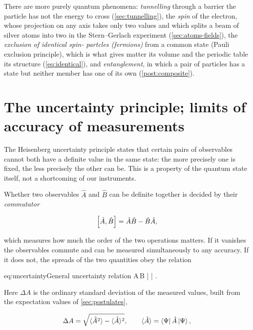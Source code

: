     There are more purely quantum phenomena: \emph{tunnelling} through a barrier the particle has not the energy to cross (\cref{sec:tunnelling}), the \emph{spin} of the electron, whose projection on any axis takes only two values and which splits a beam of silver atoms into two in the Stern--Gerlach experiment (\cref{sec:atoms-fields}), the \emph{exclusion of identical spin- partcles (fermions)} from a common state (Pauli exclusion principle), which is what gives matter its volume and the periodic table its structure (\cref{eq:identical}), and \emph{entanglement}, in which a pair of particles has a state but neither member has one of its own (\cref{post:composite}).

\section{The uncertainty principle; limits of accuracy of measurements}
\label{sec:uncertainty}

    The Heisenberg uncertainty principle states that certain pairs of observables cannot both have a definite value in the same state: the more precisely one is fixed, the less precisely the other can be. This is a property of the quantum state itself, not a shortcoming of our instruments.

    Whether two observables $\hat{A}$ and $\hat{B}$ can be definite together is decided by their \emph{commutator}

    \begin{equation*}
        \left[\hat{A},\hat{B}\right] = \hat{A}\hat{B} - \hat{B}\hat{A},
    \end{equation*}

    which measures how much the order of the two operations matters. If it vanishes the observables commute and can be measured simultaneously to any accuracy. If it does not, the spreads of the two quantities obey the relation

    \begin{keyeq}{eq:uncertainty}{General uncertainty relation}
        \Delta A\,\Delta B \geq {}\left|  \right| .
    \end{keyeq}

    Here $\Delta A$ is the ordinary standard deviation of the measured values, built from the expectation values of \cref{sec:postulates},

    \begin{equation*}
        \Delta A = \sqrt{\langle \hat{A}^{2} \rangle - \langle \hat{A} \rangle^{2}}, \qquad \langle \hat{A} \rangle = \bra{\Psi}\hat{A}\ket{\Psi},
    \end{equation*}


